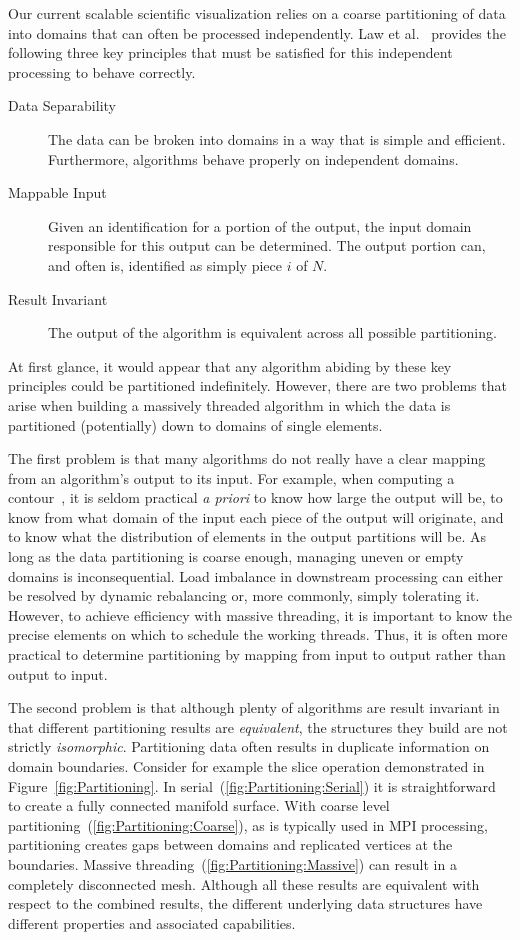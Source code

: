 \documentclass{sig-alternate}
\newcommand*{\lcite}[1]{~\cite{#1}}
\newcommand*{\scite}[1]{~\cite{#1}}
\newcommand{\etal}{et al.}
\begin{document}
\noindent
Our current scalable scientific visualization relies on a coarse
partitioning of data into domains that can often be processed
independently. Law \etal\scite{Law1999} provides the following three key
principles that must be satisfied for this independent processing to behave
correctly.

\begin{description}
\item[Data Separability] The data can be broken into domains in a way that
  is simple and efficient. Furthermore, algorithms behave properly on
  independent domains.
\item[Mappable Input] Given an identification for a portion of the output,
  the input domain responsible for this output can be determined. The
  output portion can, and often is, identified as simply piece $i$ of $N$.
\item[Result Invariant] The output of the algorithm is equivalent across
  all possible partitioning.
\end{description}

At first glance, it would appear that any algorithm abiding by these key
principles could be partitioned indefinitely. However, there are two
problems that arise when building a massively threaded algorithm in which
the data is partitioned (potentially) down to domains of single elements.

The first problem is that many algorithms do not really have a clear
mapping from an algorithm's output to its input. For example, when
computing a contour\lcite{Lorensen1987}, it is seldom practical \emph{a
  priori} to know how large the output will be, to know from what domain of
the input each piece of the output will originate, and to know what the
distribution of elements in the output partitions will be. As long as the
data partitioning is coarse enough, managing uneven or empty domains is
inconsequential. Load imbalance in downstream processing can either be
resolved by dynamic rebalancing or, more commonly, simply tolerating
it. However, to achieve efficiency with massive threading, it is important
to know the precise elements on which to schedule the working
threads. Thus, it is often more practical to determine partitioning by
mapping from input to output rather than output to input.

The second problem is that although plenty of algorithms are result
invariant in that different partitioning results are \emph{equivalent}, the
structures they build are not strictly \emph{isomorphic}. Partitioning data
often results in duplicate information on domain boundaries. Consider for
example the slice operation demonstrated in
Figure~\ref{fig:Partitioning}. In serial~(\ref{fig:Partitioning:Serial}) it
is straightforward to create a fully connected manifold surface. With
coarse level partitioning~(\ref{fig:Partitioning:Coarse}), as is typically
used in MPI processing, partitioning creates gaps between domains and
replicated vertices at the boundaries. Massive
threading~(\ref{fig:Partitioning:Massive}) can result in a completely
disconnected mesh. Although all these results are equivalent with respect
to the combined results, the different underlying data structures have
different properties and associated capabilities.
\end{document}
